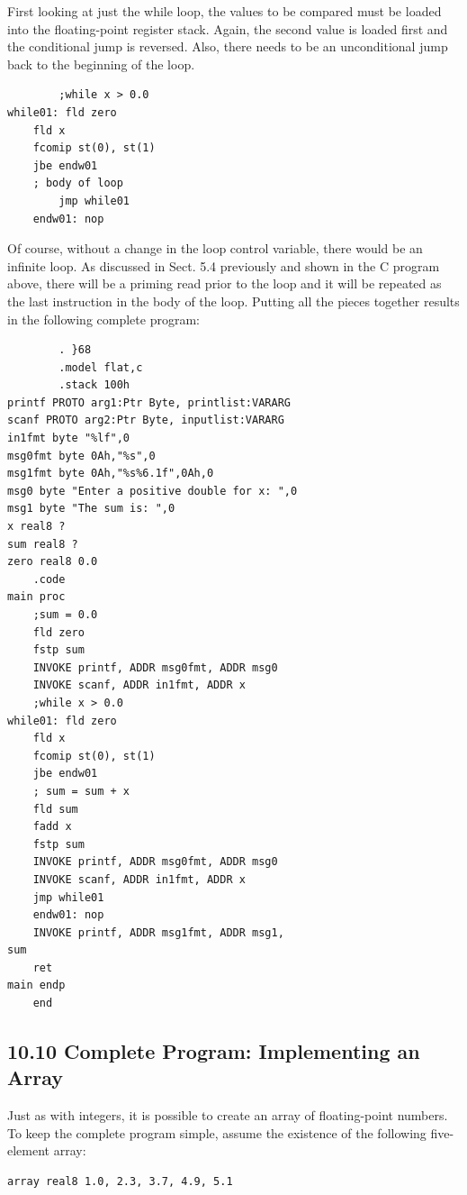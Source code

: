 \documentclass[10pt]{book}
\begin{document}
First looking at just the while loop, the values to be compared must be loaded into the floating-point register stack. Again, the second value is loaded first and the conditional jump is reversed. Also, there needs to be an unconditional jump back to the beginning of the loop.

\begin{verbatim}
        ;while x > 0.0
while01: fld zero
    fld x
    fcomip st(0), st(1)
    jbe endw01
    ; body of loop
        jmp while01
    endw01: nop
\end{verbatim}

Of course, without a change in the loop control variable, there would be an infinite loop. As discussed in Sect. 5.4 previously and shown in the C program above, there will be a priming read prior to the loop and it will be repeated as the last instruction in the body of the loop. Putting all the pieces together results in the following complete program:

\begin{verbatim}
        . }68
        .model flat,c
        .stack 100h
printf PROTO arg1:Ptr Byte, printlist:VARARG
scanf PROTO arg2:Ptr Byte, inputlist:VARARG
in1fmt byte "%lf",0
msg0fmt byte 0Ah,"%s",0
msg1fmt byte 0Ah,"%s%6.1f",0Ah,0
msg0 byte "Enter a positive double for x: ",0
msg1 byte "The sum is: ",0
x real8 ?
sum real8 ?
zero real8 0.0
    .code
main proc
    ;sum = 0.0
    fld zero
    fstp sum
    INVOKE printf, ADDR msg0fmt, ADDR msg0
    INVOKE scanf, ADDR in1fmt, ADDR x
    ;while x > 0.0
while01: fld zero
    fld x
    fcomip st(0), st(1)
    jbe endw01
    ; sum = sum + x
    fld sum
    fadd x
    fstp sum
    INVOKE printf, ADDR msg0fmt, ADDR msg0
    INVOKE scanf, ADDR in1fmt, ADDR x
    jmp while01
    endw01: nop
    INVOKE printf, ADDR msg1fmt, ADDR msg1,
sum
    ret
main endp
    end
\end{verbatim}

\subsection*{10.10 Complete Program: Implementing an Array}
Just as with integers, it is possible to create an array of floating-point numbers. To keep the complete program simple, assume the existence of the following five-element array:


\begin{verbatim}
array real8 1.0, 2.3, 3.7, 4.9, 5.1
\end{verbatim}
\end{document}
